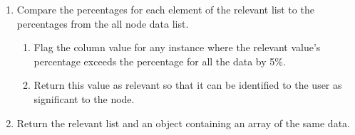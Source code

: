 \begin{enumerate}
  \item Compare the percentages for each element of the relevant list to
  the percentages from the all node data list.
  \begin{enumerate}
    \item Flag the column value for any instance where the relevant value's
    percentage exceeds the percentage for all the data by 5\%.
    \item Return this value as relevant so that it can be identified to the user
    as significant to the node.
  \end{enumerate}
  \item Return the relevant list and an object containing an array
  of the same data.
\end{enumerate}
\pagebreak

